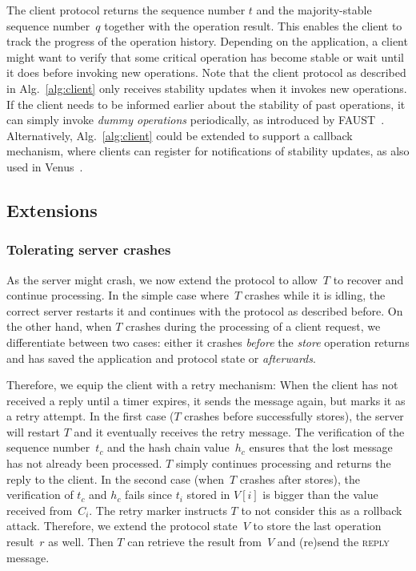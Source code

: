 \documentclass[11pt]{article}
\theoremstyle{plain-boldhead}
\theoremstyle{definition-boldhead}
\newcommand{\str}[1]{\textsc{#1}}
\newcommand{\op}[1]{\textsl{#1}}
\begin{document}
The client protocol returns the sequence number $t$ and the majority-stable
sequence number~$q$ together with the operation result.  This enables the
client to track the progress of the operation history.  Depending on the
application, a client might want to verify that some critical operation has
become stable or wait until it does before invoking new operations.  Note
that the client protocol as described in Alg.~\ref{alg:client} only
receives stability updates when it invokes new operations.  If the client
needs to be informed earlier about the stability of past operations, it can
simply invoke \emph{dummy operations} periodically, as introduced by
FAUST~\cite{cakesh11}.
% 
Alternatively, Alg.~\ref{alg:client} could be extended to support a
callback mechanism, where clients can register for notifications of
stability updates, as also used in Venus~\cite{scckms10}.


\subsection{Extensions}

\subsubsection{Tolerating server crashes}

As the server might crash, we now extend the protocol to allow~$T$ to recover and continue processing.  In the simple case
where~$T$ crashes while it is idling, the correct server restarts it and
continues with the protocol as described before.  On the other hand, when
$T$ crashes during the processing of a client request, we differentiate
between two cases: either it crashes \emph{before} the \op{store} operation
returns and has saved the application and protocol state or
\emph{afterwards}.
 
Therefore, we equip the client with a retry mechanism: When the client has not
received a reply until a timer expires, it sends the message again,
but marks it as a retry attempt.  In the first case ($T$ crashes before
successfully stores), the server will restart $T$ and it
eventually receives the retry message.  The verification of the sequence
number~$t_c$ and the hash chain value~$h_c$ ensures that the lost message
has not already been processed.  $T$ simply continues processing and
returns the reply to the client.  In the second case (when~$T$ crashes
after stores), the verification of $t_c$ and $h_c$ fails since
$t_i$ stored in $V[i]$ is bigger than the value received from~$C_i$.  The
retry marker instructs $T$ to not consider this as a rollback attack.
Therefore, we extend the protocol state~$V$ to store the last operation
result~$r$ as well.  Then $T$ can retrieve the result from~$V$ and
(re)send the \str{reply} message.
\end{document}

